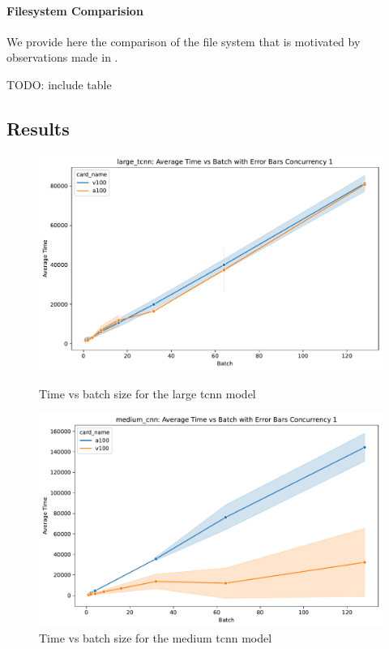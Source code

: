 \documentclass[sigplan,screen,noacm]{acmart}
\begin{document}
\paragraph{Filesystem Comparision}

We provide here the comparison of the file system that is motivated by observations made in \cite{???}.


TODO: include table



\subsection{Results}

\begin{figure}[h]

\begin{minipage}[t]{0.4\textwidth}
  \centering
  \includegraphics[width=1.0\linewidth]{images/time_vs_batch_large_tcnn_1.pdf}
  \caption{Time vs batch size for the large tcnn model}
    \label{fig:time-batch-large}

  \centering
  \includegraphics[width=1.0\linewidth]{images/time_vs_batch_medium_cnn_1.pdf}
  \caption{Time vs batch size for the medium tcnn model}
    \label{fig:time-batch-medium}


\end{minipage}
\end{figure}
\end{document}
